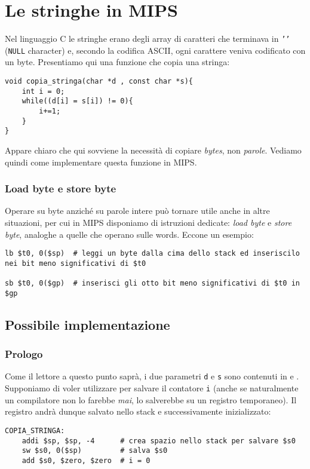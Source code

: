 \section{Le stringhe in MIPS}\label{sec:mipstring}
Nel linguaggio C le stringhe erano degli array di caratteri che terminava in \texttt{'\0'} (\texttt{NULL} character)
e, secondo la codifica ASCII, ogni carattere veniva codificato con un byte. Presentiamo qui una funzione che copia una stringa:
\begin{verbatim}
void copia_stringa(char *d , const char *s){
	int i = 0;
	while((d[i] = s[i]) != 0){
		i+=1;
	}
}
\end{verbatim}
Appare chiaro che qui sovviene la necessità di copiare \emph{bytes}, non \emph{parole}. Vediamo quindi come implementare questa funzione in MIPS.

\subsubsection{Load byte e store byte}
Operare su byte anziché su parole intere può tornare utile anche in altre situazioni, per cui in MIPS disponiamo di istruzioni dedicate: \emph{load byte} e \emph{store byte}, analoghe a quelle che operano sulle words. Eccone un esempio:
\begin{verbatim}
lb $t0, 0($sp)  # leggi un byte dalla cima dello stack ed inseriscilo nei bit meno significativi di $t0

sb $t0, 0($gp)  # inserisci gli otto bit meno significativi di $t0 in $gp
\end{verbatim}

\subsection{Possibile implementazione}

\subsubsection{Prologo}
Come il lettore a questo punto saprà, i due parametri \texttt{d} e \texttt{s} sono contenuti in  e . Supponiamo di voler utilizzare  per salvare il contatore \texttt{i} (anche se naturalmente un compilatore non lo farebbe \emph{mai}, lo salverebbe su un registro temporaneo). Il registro  andrà dunque salvato nello stack e successivamente inizializzato:
\begin{verbatim}
COPIA_STRINGA:
	addi $sp, $sp, -4      # crea spazio nello stack per salvare $s0
	sw $s0, 0($sp)         # salva $s0
	add $s0, $zero, $zero  # i = 0
\end{verbatim}

